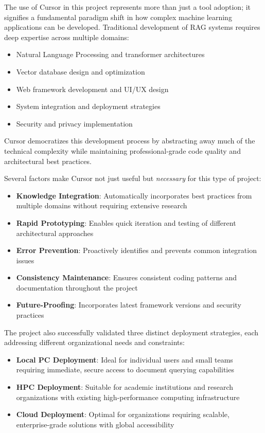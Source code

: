\documentclass[12pt,letterpaper]{article}
\begin{document}
The use of Cursor in this project represents more than just a tool adoption; it signifies a fundamental paradigm shift in how complex machine learning applications can be developed. Traditional development of RAG systems requires deep expertise across multiple domains:

\begin{itemize}
    \item Natural Language Processing and transformer architectures
    \item Vector database design and optimization
    \item Web framework development and UI/UX design
    \item System integration and deployment strategies
    \item Security and privacy implementation
\end{itemize}

Cursor democratizes this development process by abstracting away much of the technical complexity while maintaining professional-grade code quality and architectural best practices.

Several factors make Cursor not just useful but \textit{necessary} for this type of project:

\begin{itemize}
    \item \textbf{Knowledge Integration}: Automatically incorporates best practices from multiple domains without requiring extensive research
    \item \textbf{Rapid Prototyping}: Enables quick iteration and testing of different architectural approaches
    \item \textbf{Error Prevention}: Proactively identifies and prevents common integration issues
    \item \textbf{Consistency Maintenance}: Ensures consistent coding patterns and documentation throughout the project
    \item \textbf{Future-Proofing}: Incorporates latest framework versions and security practices
\end{itemize}

The project also successfully validated three distinct deployment strategies, each addressing different organizational needs and constraints:

\begin{itemize}
    \item \textbf{Local PC Deployment}: Ideal for individual users and small teams requiring immediate, secure access to document querying capabilities
    \item \textbf{HPC Deployment}: Suitable for academic institutions and research organizations with existing high-performance computing infrastructure
    \item \textbf{Cloud Deployment}: Optimal for organizations requiring scalable, enterprise-grade solutions with global accessibility
\end{itemize}
\end{document}
